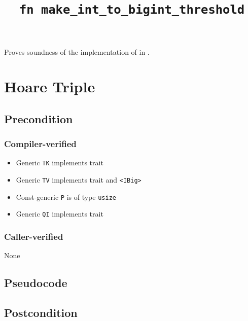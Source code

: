 \documentclass{article}
\title{\texttt{fn make\_int\_to\_bigint\_threshold}}
\author{\MichaelShoemateAuthor}
\date{}
\begin{document}
\maketitle

\contrib
Proves soundness of the implementation of  in .

\section{Hoare Triple}
\subsection*{Precondition}
\subsubsection*{Compiler-verified}

\begin{itemize}
    \item Generic \texttt{TK} implements trait 
    \item Generic \texttt{TV} implements trait  and \texttt{<IBig>}
    \item Const-generic \texttt{P} is of type \texttt{usize}
    \item Generic \texttt{QI} implements trait 
\end{itemize}

\subsubsection*{Caller-verified}
None

\subsection*{Pseudocode}


\subsection*{Postcondition}
\begin{theorem}
\end{theorem}
\end{document}
